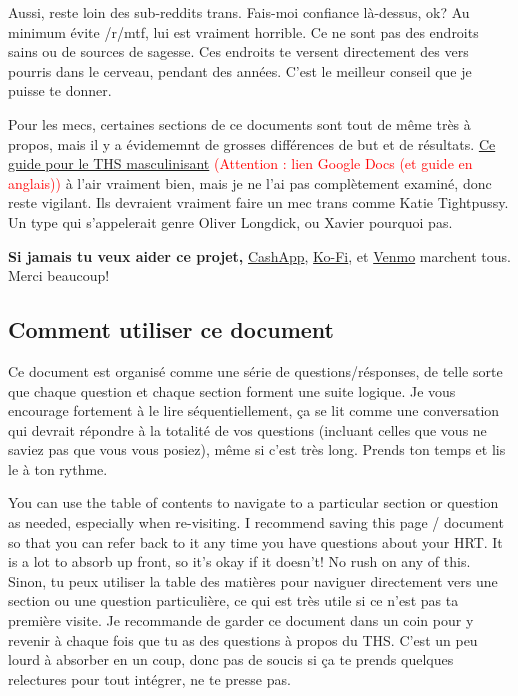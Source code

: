 \documentclass{article}
\begin{document}
Aussi, reste loin des sub-reddits trans. Fais-moi confiance là-dessus, ok? Au minimum évite /r/mtf, lui est vraiment horrible. Ce ne sont pas des endroits sains ou de sources de sagesse. Ces endroits te versent directement des vers pourris dans le cerveau, pendant des années. C'est le meilleur conseil que je puisse te donner.

Pour les mecs, certaines sections de ce documents sont tout de même très à propos, mais il y a évidememnt de grosses différences de but et de résultats. \href{https://docs.google.com/document/d/1DXFxzN0XTudPZez\_SO61fpqncRLPH\_Be\_QG\_8Pcz9LU/edit?tab=t.0}{Ce guide pour le THS masculinisant} \textcolor{red}{(Attention : lien Google Docs (et guide en anglais))} à l'air vraiment bien, mais je ne l'ai pas complètement examiné, donc reste vigilant. Ils devraient vraiment faire un mec trans comme Katie Tightpussy. Un type qui s'appelerait genre Oliver Longdick, ou Xavier pourquoi pas. 

\textbf{Si jamais tu veux aider ce projet,} \href{https://cash.app/Katitties}{CashApp}, \href{https://ko-fi.com/katitties}{Ko-Fi}, et \href{https://account.venmo.com/u/katitties}{Venmo} marchent tous. Merci beaucoup!

\subsection*{Comment utiliser ce document}

Ce document est organisé comme une série de questions/résponses, de telle sorte que chaque question et chaque section forment une suite logique. Je vous encourage fortement à le lire séquentiellement, ça se lit comme une conversation qui devrait répondre à la totalité de vos questions (incluant celles que vous ne saviez pas que vous vous posiez), même si c'est très long. Prends ton temps et lis le à ton rythme. 

You can use the table of contents to navigate to a particular section or question as needed, especially when re-visiting. I recommend saving this page / document so that you can refer back to it any time you have questions about your HRT. It is a lot to absorb up front, so it’s okay if it doesn’t! No rush on any of this.
Sinon, tu peux utiliser la table des matières pour naviguer directement vers une section ou une question particulière, ce qui est très utile si ce n'est pas ta première visite. Je recommande de garder ce document dans un coin pour y revenir à chaque fois que tu as des questions à propos du THS. C'est un peu lourd à absorber en un coup, donc pas de soucis si ça te prends quelques relectures pour tout intégrer, ne te presse pas. 
\end{document}
